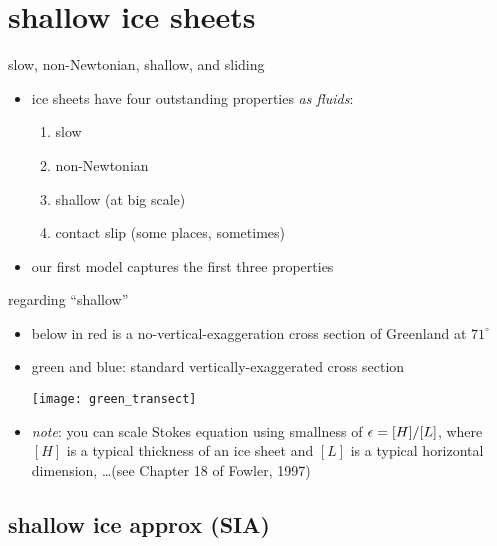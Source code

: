 
\section{shallow ice sheets}

\begin{frame}{slow, non-Newtonian, shallow, and sliding}

\begin{itemize}
\item ice sheets have four outstanding properties \emph{as fluids}:
  \begin{enumerate}
  \item slow
  \item non-Newtonian
  \item shallow (at big scale)
  \item<1> contact slip (some places, sometimes)
  \end{enumerate}

\bigskip
\item<2> our first model captures the first three properties
\end{itemize}
\end{frame}


\begin{frame}{regarding ``shallow''}

\begin{itemize}
\item below in \alert{red} is a no-vertical-exaggeration cross section of Greenland at $71^\circ$
\small
\item green and blue: standard vertically-exaggerated cross section

\medskip
\begin{center}
  \texttt{[image: green\_transect]}
\end{center}

\medskip
\footnotesize
\item \emph{note}: you can scale Stokes equation using smallness of $\epsilon = [H]/[L]$, where $[H]$ is a typical thickness of an ice sheet and $[L]$ is a typical horizontal dimension, \dots (see Chapter 18 of Fowler, 1997)\nocite{Fowler}
\end{itemize}
\end{frame}


\subsection{shallow ice approx (SIA)}

